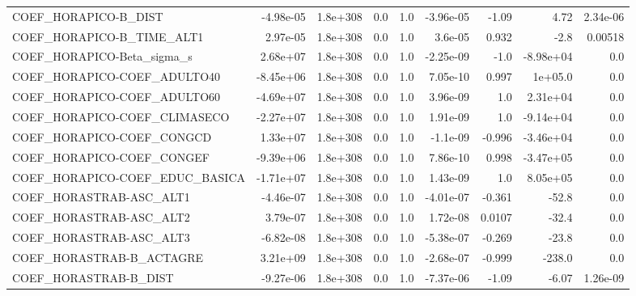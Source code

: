 \begin{tabular}{lrrrrrrrr}
COEF\_HORAPICO-B\_DIST              &   -4.98e-05 &     1.8e+308 &     0.0 &      1.0 &  -3.96e-05 &       -1.09 &         4.72 &      2.34e-06 \\
COEF\_HORAPICO-B\_TIME\_ALT1         &    2.97e-05 &     1.8e+308 &     0.0 &      1.0 &    3.6e-05 &       0.932 &         -2.8 &       0.00518 \\
COEF\_HORAPICO-Beta\_sigma\_s        &    2.68e+07 &     1.8e+308 &     0.0 &      1.0 &  -2.25e-09 &        -1.0 &    -8.98e+04 &           0.0 \\
COEF\_HORAPICO-COEF\_ADULTO40       &   -8.45e+06 &     1.8e+308 &     0.0 &      1.0 &   7.05e-10 &       0.997 &      1e+05.0 &           0.0 \\
COEF\_HORAPICO-COEF\_ADULTO60       &   -4.69e+07 &     1.8e+308 &     0.0 &      1.0 &   3.96e-09 &         1.0 &     2.31e+04 &           0.0 \\
COEF\_HORAPICO-COEF\_CLIMASECO      &   -2.27e+07 &     1.8e+308 &     0.0 &      1.0 &   1.91e-09 &         1.0 &    -9.14e+04 &           0.0 \\
COEF\_HORAPICO-COEF\_CONGCD         &    1.33e+07 &     1.8e+308 &     0.0 &      1.0 &   -1.1e-09 &      -0.996 &    -3.46e+04 &           0.0 \\
COEF\_HORAPICO-COEF\_CONGEF         &   -9.39e+06 &     1.8e+308 &     0.0 &      1.0 &   7.86e-10 &       0.998 &    -3.47e+05 &           0.0 \\
COEF\_HORAPICO-COEF\_EDUC\_BASICA    &   -1.71e+07 &     1.8e+308 &     0.0 &      1.0 &   1.43e-09 &         1.0 &     8.05e+05 &           0.0 \\
COEF\_HORASTRAB-ASC\_ALT1           &   -4.46e-07 &     1.8e+308 &     0.0 &      1.0 &  -4.01e-07 &      -0.361 &        -52.8 &           0.0 \\
COEF\_HORASTRAB-ASC\_ALT2           &    3.79e-07 &     1.8e+308 &     0.0 &      1.0 &   1.72e-08 &      0.0107 &        -32.4 &           0.0 \\
COEF\_HORASTRAB-ASC\_ALT3           &   -6.82e-08 &     1.8e+308 &     0.0 &      1.0 &  -5.38e-07 &      -0.269 &        -23.8 &           0.0 \\
COEF\_HORASTRAB-B\_ACTAGRE          &    3.21e+09 &     1.8e+308 &     0.0 &      1.0 &  -2.68e-07 &      -0.999 &       -238.0 &           0.0 \\
COEF\_HORASTRAB-B\_DIST             &   -9.27e-06 &     1.8e+308 &     0.0 &      1.0 &  -7.37e-06 &       -1.09 &        -6.07 &      1.26e-09 \\

\end{tabular}
